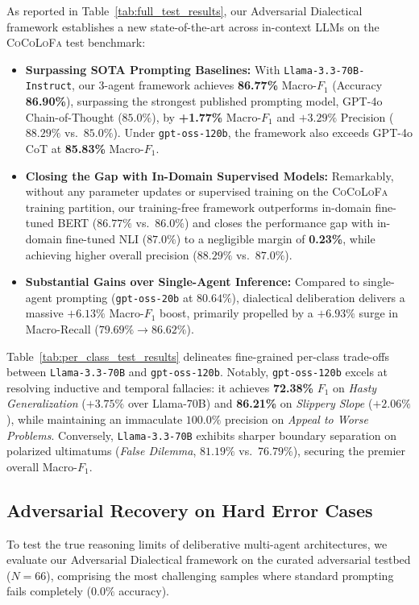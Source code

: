 \documentclass[11pt]{article}
\begin{document}
As reported in Table~\ref{tab:full_test_results}, our Adversarial Dialectical framework establishes a new state-of-the-art across in-context LLMs on the \textsc{CoCoLoFa} test benchmark:
\begin{itemize}[leftmargin=*,itemsep=1.5pt,topsep=2pt]
    \item \textbf{Surpassing SOTA Prompting Baselines:} With \texttt{Llama-3.3-70B-Instruct}, our 3-agent framework achieves \textbf{86.77\%} Macro-$F_1$ (Accuracy \textbf{86.90\%}), surpassing the strongest published prompting model, GPT-4o Chain-of-Thought ($85.0\%$), by \textbf{+1.77\%} Macro-$F_1$ and $+3.29\%$ Precision ($88.29\%$ vs.\ $85.0\%$). Under \texttt{gpt-oss-120b}, the framework also exceeds GPT-4o CoT at \textbf{85.83\%} Macro-$F_1$.
    \item \textbf{Closing the Gap with In-Domain Supervised Models:} Remarkably, without any parameter updates or supervised training on the \textsc{CoCoLoFa} training partition, our training-free framework outperforms in-domain fine-tuned BERT ($86.77\%$ vs.\ $86.0\%$) and closes the performance gap with in-domain fine-tuned NLI ($87.0\%$) to a negligible margin of \textbf{0.23\%}, while achieving higher overall precision ($88.29\%$ vs.\ $87.0\%$).
    \item \textbf{Substantial Gains over Single-Agent Inference:} Compared to single-agent prompting (\texttt{gpt-oss-20b} at $80.64\%$), dialectical deliberation delivers a massive $+6.13\%$ Macro-$F_1$ boost, primarily propelled by a $+6.93\%$ surge in Macro-Recall ($79.69\% \to 86.62\%$).
\end{itemize}

Table~\ref{tab:per_class_test_results} delineates fine-grained per-class trade-offs between \texttt{Llama-3.3-70B} and \texttt{gpt-oss-120b}. Notably, \texttt{gpt-oss-120b} excels at resolving inductive and temporal fallacies: it achieves \textbf{72.38\%} $F_1$ on \textit{Hasty Generalization} ($+3.75\%$ over Llama-70B) and \textbf{86.21\%} on \textit{Slippery Slope} ($+2.06\%$), while maintaining an immaculate $100.0\%$ precision on \textit{Appeal to Worse Problems}. Conversely, \texttt{Llama-3.3-70B} exhibits sharper boundary separation on polarized ultimatums (\textit{False Dilemma}, $81.19\%$ vs.\ $76.79\%$), securing the premier overall Macro-$F_1$.

\subsection{Adversarial Recovery on Hard Error Cases}
To test the true reasoning limits of deliberative multi-agent architectures, we evaluate our Adversarial Dialectical framework on the curated adversarial testbed ($N=66$), comprising the most challenging samples where standard prompting fails completely ($0.0\%$ accuracy).
\end{document}
